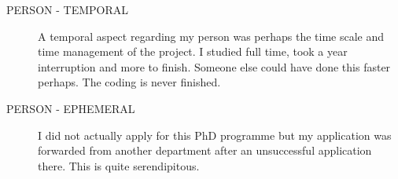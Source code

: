 \begin{description}
  \item[PERSON - TEMPORAL] A temporal aspect regarding my person was perhaps the time scale and time management of the project. I studied full time, took a year interruption and more to finish.  Someone else could have done this faster perhaps. The coding is never finished.
  \item[PERSON - EPHEMERAL] I did not actually apply for this PhD programme but my application was forwarded from another department after an unsuccessful application there. This is quite serendipitous.
\end{description}
\spirals

